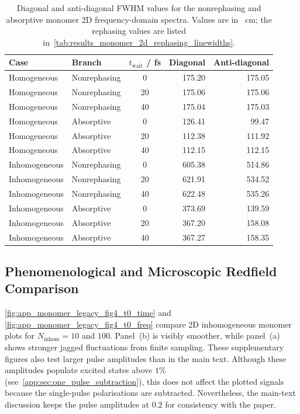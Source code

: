 \begin{table}[htbp]
    \centering
    \scriptsize
    \caption{Diagonal and anti-diagonal FWHM values for the nonrephasing and
    absorptive monomer 2D frequency-domain spectra. Values are in
    \si{\per\centi\metre}; the rephasing values are listed
    in~\autoref{tab:results_monomer_2d_rephasing_linewidths}.}
    \label{tab:app_monomer_2d_branch_linewidths}
    \begin{tabular}{@{}llcrr@{}}
        \toprule
        Case & Branch & $t_{\mathrm{wait}}$ / fs & Diagonal & Anti-diagonal \\
        \midrule
        Homogeneous & Nonrephasing & 0  & 175.20 & 175.05 \\
        Homogeneous & Nonrephasing & 20 & 175.06 & 175.06 \\
        Homogeneous & Nonrephasing & 40 & 175.04 & 175.03 \\
        Homogeneous & Absorptive & 0  & 126.41 & 99.47 \\
        Homogeneous & Absorptive & 20 & 112.38 & 111.92 \\
        Homogeneous & Absorptive & 40 & 112.15 & 112.15 \\
        Inhomogeneous & Nonrephasing & 0  & 605.38 & 514.86 \\
        Inhomogeneous & Nonrephasing & 20 & 621.91 & 534.52 \\
        Inhomogeneous & Nonrephasing & 40 & 622.48 & 535.26 \\
        Inhomogeneous & Absorptive & 0  & 373.69 & 139.59 \\
        Inhomogeneous & Absorptive & 20 & 367.20 & 158.08 \\
        Inhomogeneous & Absorptive & 40 & 367.27 & 158.35 \\
        \bottomrule
    \end{tabular}
\end{table}

\subsection{Phenomenological and Microscopic Redfield Comparison}

\autoref{fig:app_monomer_legacy_fig4_t0_time} and
\autoref{fig:app_monomer_legacy_fig4_t0_freq} compare 2D inhomogeneous
monomer plots for \(N_{\mathrm{inhom}}=10\) and \(100\). Panel~(b) is visibly
smoother, while panel~(a) shows stronger jagged fluctuations from finite
sampling. These supplementary figures also test larger pulse amplitudes than in
the main text. Although these amplitudes populate excited states above \(1\%\)
(see~\autoref{app:sec:one_pulse_subtraction}), this does not affect the plotted
signals because the single-pulse polarisations are subtracted. Nevertheless,
the main-text discussion keeps the pulse amplitudes at \(0.2\) for consistency
with the paper.



